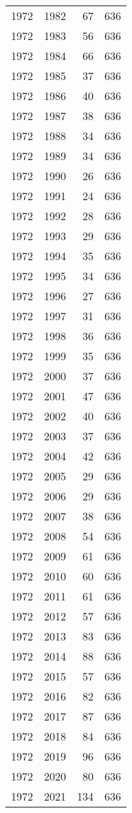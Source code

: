 \documentclass[
  11pt,
  letterpaper,
  DIV=11,
  numbers=noendperiod,
  twoside]{scrartcl}
\begin{document}
\begin{longtable}[]{@{}rrrr@{}}
1972 & 1982 & 67 & 636 \\
1972 & 1983 & 56 & 636 \\
1972 & 1984 & 66 & 636 \\
1972 & 1985 & 37 & 636 \\
1972 & 1986 & 40 & 636 \\
1972 & 1987 & 38 & 636 \\
1972 & 1988 & 34 & 636 \\
1972 & 1989 & 34 & 636 \\
1972 & 1990 & 26 & 636 \\
1972 & 1991 & 24 & 636 \\
1972 & 1992 & 28 & 636 \\
1972 & 1993 & 29 & 636 \\
1972 & 1994 & 35 & 636 \\
1972 & 1995 & 34 & 636 \\
1972 & 1996 & 27 & 636 \\
1972 & 1997 & 31 & 636 \\
1972 & 1998 & 36 & 636 \\
1972 & 1999 & 35 & 636 \\
1972 & 2000 & 37 & 636 \\
1972 & 2001 & 47 & 636 \\
1972 & 2002 & 40 & 636 \\
1972 & 2003 & 37 & 636 \\
1972 & 2004 & 42 & 636 \\
1972 & 2005 & 29 & 636 \\
1972 & 2006 & 29 & 636 \\
1972 & 2007 & 38 & 636 \\
1972 & 2008 & 54 & 636 \\
1972 & 2009 & 61 & 636 \\
1972 & 2010 & 60 & 636 \\
1972 & 2011 & 61 & 636 \\
1972 & 2012 & 57 & 636 \\
1972 & 2013 & 83 & 636 \\
1972 & 2014 & 88 & 636 \\
1972 & 2015 & 57 & 636 \\
1972 & 2016 & 82 & 636 \\
1972 & 2017 & 87 & 636 \\
1972 & 2018 & 84 & 636 \\
1972 & 2019 & 96 & 636 \\
1972 & 2020 & 80 & 636 \\
1972 & 2021 & 134 & 636 \\

\end{longtable}
\end{document}
